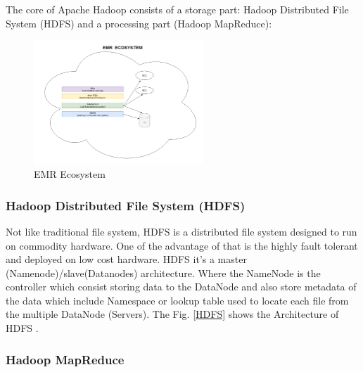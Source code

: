 \documentclass[journal]{IEEEtran}
\begin{document}
The core of Apache Hadoop consists of a storage part: Hadoop Distributed File System (HDFS) and a processing part (Hadoop MapReduce):

\begin{figure}
	\centering
	\includegraphics[width=2.5in]{EMR_Ecosystem.png}
	\caption{EMR Ecosystem}
	\label{EMR}
\end{figure}

\subsubsection{Hadoop Distributed File System (HDFS)}

Not like traditional file system, HDFS is a distributed file system designed to run on commodity hardware. One of the advantage of that is the highly fault tolerant and deployed on low cost hardware. HDFS it's a master (Namenode)/slave(Datanodes) architecture. Where the NameNode is the controller which consist storing data to the DataNode and also store metadata of the data which include Namespace or lookup table used to locate each file from the multiple DataNode (Servers). The Fig. \ref{HDFS} shows the Architecture of HDFS \cite{HDFS}.

\subsubsection{Hadoop MapReduce}
\end{document}
